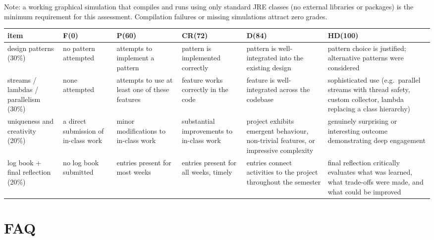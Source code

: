 \documentclass[twoside=false,DIV=14]{scrartcl}
\begin{document}
Note: a working graphical simulation that compiles and runs using only standard JRE classes (no external libraries or packages) is the minimum requirement for this assessment.  Compilation failures or missing simulations attract zero grades.

\begin{tabular}{@{}p{}|p{}p{}p{}p{}p{}@{}}
\hline
item & F(0) & P(60) & CR(72) & D(84) & HD(100)\\
\hline \hline
design patterns (30\%) &
no pattern attempted &
attempts to implement a pattern &
pattern is implemented correctly &
pattern is well-integrated into the existing design &
pattern choice is justified; alternative patterns were considered\\
\hline
streams / lambdas / parallelism (30\%) &
none attempted &
attempts to use at least one of these features &
feature works correctly in the code &
feature is well-integrated across the codebase &
sophisticated use (e.g.\ parallel streams with thread safety, custom collector, lambda replacing a class hierarchy)\\
\hline
uniqueness and creativity (20\%) &
a direct submission of in-class work &
minor modifications to in-class work &
substantial improvements to in-class work &
project exhibits emergent behaviour, non-trivial features, or impressive complexity &
genuinely surprising or interesting outcome demonstrating deep engagement\\
\hline
log book + final reflection (20\%) &
no log book submitted &
entries present for most weeks &
entries present for all weeks, timely &
entries connect activities to the project throughout the semester &
final reflection critically evaluates what was learned, what trade-offs were made, and what could be improved\\
\hline
\end{tabular}

\section{FAQ}
\end{document}
